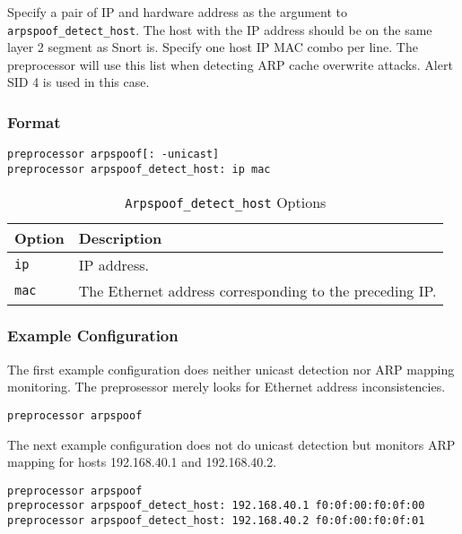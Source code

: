 \documentclass[english]{report}
\begin{document}
Specify a pair of IP and hardware address as the argument to \texttt{arpspoof\_detect\_host}.
The host with the IP address should be on the same layer 2 segment as Snort is.
Specify one host IP MAC combo per line. The preprocessor will use this list when
detecting ARP cache overwrite attacks.  Alert SID 4 is used in this case.

\subsubsection{Format}
\begin{verbatim}
preprocessor arpspoof[: -unicast]
preprocessor arpspoof_detect_host: ip mac                   
\end{verbatim}

\begin{table}[hbpt]{}
\caption{\texttt{Arpspoof\_detect\_host} Options}
\begin{minipage}[hbpt]{6in}
\begin{center}\begin{tabular}{| l | l |}
\hline 
\textbf{Option} & \textbf{Description}\\
\hline
\hline
\texttt{ip} &
IP address.\\
\hline 
\texttt{mac} & The Ethernet address corresponding to the preceding IP. \\
\hline
\end{tabular}
\end{center}
\end{minipage}
\end{table}

\subsubsection{Example Configuration}

The first example configuration does neither unicast detection nor ARP mapping 
monitoring. The preprosessor merely looks for Ethernet address inconsistencies.

\begin{verbatim}
preprocessor arpspoof
\end{verbatim}

The next example configuration does not do unicast detection but monitors ARP
mapping for hosts 192.168.40.1 and 192.168.40.2.
\begin{verbatim}
preprocessor arpspoof
preprocessor arpspoof_detect_host: 192.168.40.1 f0:0f:00:f0:0f:00
preprocessor arpspoof_detect_host: 192.168.40.2 f0:0f:00:f0:0f:01
\end{verbatim}
\end{document}
